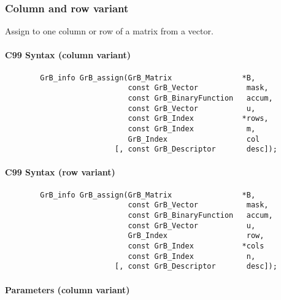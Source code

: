 \subsubsection{Column and row variant}

Assign to one column or row of a matrix from a vector.  

\paragraph{C99 Syntax (column variant)}

\begin{verbatim}
        GrB_info GrB_assign(GrB_Matrix                *B,
                            const GrB_Vector           mask,
                            const GrB_BinaryFunction   accum,
                            const GrB_Vector           u,
                            const GrB_Index           *rows,
                            const GrB_Index            m,
                            GrB_Index                  col
                         [, const GrB_Descriptor       desc]); 
\end{verbatim}

\paragraph{C99 Syntax (row variant)}

\begin{verbatim}
        GrB_info GrB_assign(GrB_Matrix                *B,
                            const GrB_Vector           mask,
                            const GrB_BinaryFunction   accum,
                            const GrB_Vector           u,
                            GrB_Index                  row,
                            const GrB_Index           *cols
                            const GrB_Index            n,
                         [, const GrB_Descriptor       desc]); 
\end{verbatim}

\paragraph{Parameters (column variant)}


